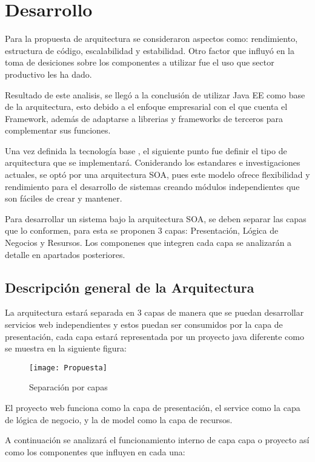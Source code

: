 \chapter{Desarrollo}

Para la propuesta de arquitectura se consideraron aspectos como: rendimiento, estructura de código, escalabilidad y estabilidad. Otro factor que influyó en la toma de desiciones sobre los componentes a utilizar fue el uso que sector productivo les ha dado.

Resultado de este analisis, se llegó a la conclusión de utilizar Java EE como base de la arquitectura, esto debido a el enfoque empresarial con el que cuenta el Framework, además de adaptarse a librerias y frameworks de terceros para complementar sus funciones.

Una vez definida la tecnología base , el siguiente punto fue definir el tipo de arquitectura que se implementará. Coniderando los estandares e investigaciones actuales, se optó por una arquitectura SOA, pues este modelo ofrece flexibilidad y rendimiento para el desarrollo de sistemas creando módulos independientes que son fáciles de crear y mantener.

Para desarrollar un sistema bajo la arquitectura SOA, se deben separar las capas que lo conformen, para esta se proponen 3 capas: Presentación, Lógica de Negocios y Resursos. Los componenes que integren cada capa se analizarán a detalle en apartados posteriores.

\section{Descripción general de la Arquitectura}
La arquitectura estará separada en 3 capas de manera que se puedan desarrollar servicios web independientes y estos puedan ser consumidos por la capa de presentación, cada capa estará representada por un proyecto java diferente como se muestra en la siguiente figura:

\begin{figure}[H]
  \begin{center}
    \texttt{[image: Propuesta]}
  \end{center}
  \caption{Separación por capas}
\end{figure}

El proyecto web funciona como la capa de presentación, el service como la capa de lógica de negocio, y la de model como la capa de recursos. 

A continuación se analizará el funcionamiento interno de capa capa o proyecto así como los componentes que influyen en cada una:


